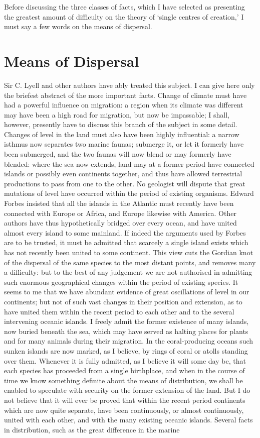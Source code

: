 \indent Before discussing the three classes of facts, which I have selected as presenting the greatest amount of difficulty on the theory of `single centres of creation,' I must say a few words on the means of dispersal.~\\

\section{Means of Dispersal}
\indent Sir C. Lyell and other authors have ably treated this subject. I can give here only the briefest abstract of the more important facts. Change of climate must have had a powerful influence on migration: a region when its climate was different may have been a high road for migration, but now be impassable; I shall, however, presently have to discuss this branch of the subject in some detail. Changes of level in the land must also have been highly influential: a narrow isthmus now separates two marine faunas; submerge it, or let it formerly have been submerged, and the two faunas will now blend or may formerly have blended: where the sea now extends, land may at a former period have connected islands or possibly even continents together, and thus have allowed terrestrial productions to pass from one to the other. No geologist will dispute that great mutations of level have occurred within the period of existing organisms. Edward Forbes insisted that all the islands in the Atlantic must recently have been connected with Europe or Africa, and Europe likewise with America. Other authors have thus hypothetically bridged over every ocean, and have united almost every island to some mainland. If indeed the arguments used by Forbes are to be trusted, it must be admitted that scarcely a single island exists which has not recently been united to some continent. This view cuts the Gordian knot of the dispersal of the same species to the most distant points, and removes many a difficulty: but to the best of any judgement we are not authorised in admitting such enormous geographical changes within the period of existing species. It seems to me that we have abundant evidence of great oscillations of level in our continents; but not of such vast changes in their position and extension, as to have united them within the recent period to each other and to the several intervening oceanic islands. I freely admit the former existence of many islands, now buried beneath the sea, which may have served as halting places for plants and for many animals during their migration. In the coral-producing oceans such sunken islands are now marked, as I believe, by rings of coral or atolls standing over them. Whenever it is fully admitted, as I believe it will some day be, that each species has proceeded from a single birthplace, and when in the course of time we know something definite about the means of distribution, we shall be enabled to speculate with security on the former extension of the land. But I do not believe that it will ever be proved that within the recent period continents which are now quite separate, have been continuously, or almost continuously, united with each other, and with the many existing oceanic islands. Several facts in distribution, such as the great difference in the marine 